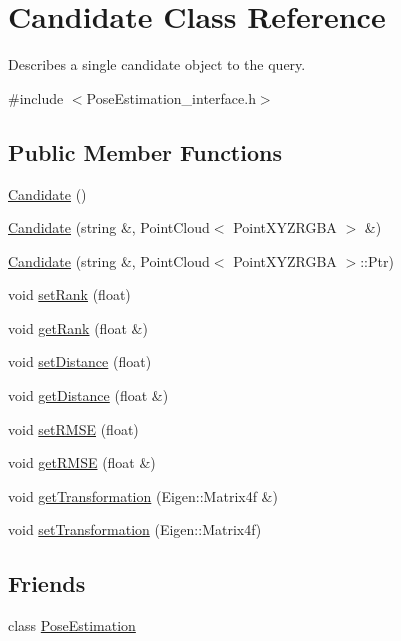 \hypertarget{classCandidate}{\section{Candidate Class Reference}
\label{classCandidate}
}


Describes a single candidate object to the query.  




{\ttfamily \#include $<$Pose\-Estimation\-\_\-interface.\-h$>$}

\subsection*{Public Member Functions}
\begin{DoxyCompactItemize}
\item 
\hyperlink{classCandidate_aa2747741fb662af5e8f3d01d1d1a43b6}{Candidate} ()
\item 
\hyperlink{classCandidate_a248d5d3260dd4de9fd4fc9d57c227556}{Candidate} (string \&, Point\-Cloud$<$ Point\-X\-Y\-Z\-R\-G\-B\-A $>$ \&)
\item 
\hyperlink{classCandidate_aba6a77d6893cb406902baff0eb6c376c}{Candidate} (string \&, Point\-Cloud$<$ Point\-X\-Y\-Z\-R\-G\-B\-A $>$\-::Ptr)
\item 
void \hyperlink{classCandidate_ae97329d23d392f22dc2cb5416e624921}{set\-Rank} (float)
\item 
void \hyperlink{classCandidate_add0268759b7a3b9037914e8435befac5}{get\-Rank} (float \&)
\item 
void \hyperlink{classCandidate_a3fdc5aa3bc0f7165db679c58b3db3ac0}{set\-Distance} (float)
\item 
void \hyperlink{classCandidate_a5d37e7b377ae89e90b9c621a861bc515}{get\-Distance} (float \&)
\item 
void \hyperlink{classCandidate_a99e4f7aa09cb990a63850c5661146f10}{set\-R\-M\-S\-E} (float)
\item 
void \hyperlink{classCandidate_a81d6749b43f4118dd4db68deee38e9ac}{get\-R\-M\-S\-E} (float \&)
\item 
void \hyperlink{classCandidate_aee22665fbda62ea1517400dca0c0c812}{get\-Transformation} (Eigen\-::\-Matrix4f \&)
\item 
void \hyperlink{classCandidate_a4ca96ab485de6e9b9d32902c40750096}{set\-Transformation} (Eigen\-::\-Matrix4f)
\end{DoxyCompactItemize}
\subsection*{Friends}
\begin{DoxyCompactItemize}
\item 
class \hyperlink{classCandidate_acc93828d970ba58835be2e8221c7a669}{Pose\-Estimation}
\end{DoxyCompactItemize}


